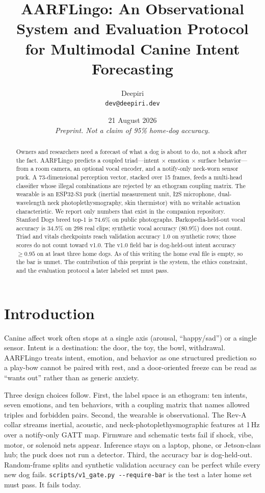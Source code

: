 \documentclass[11pt]{article}
\title{AARFLingo: An Observational System and Evaluation Protocol\\
for Multimodal Canine Intent Forecasting}
\author{Deepiri\\
\texttt{dev@deepiri.dev}}
\date{21 August 2026\\[0.4em]
\textit{Preprint. Not a claim of 95\% home-dog accuracy.}}
\begin{document}
\maketitle

\begin{abstract}
Owners and researchers need a forecast of what a dog is about to do, not a shock after the fact.
AARFLingo predicts a coupled triad---intent $\times$ emotion $\times$ surface behavior---from a room camera,
an optional vocal encoder, and a notify-only neck-worn sensor puck.
A 73-dimensional perception vector, stacked over 15 frames, feeds a multi-head classifier whose illegal
combinations are rejected by an ethogram coupling matrix.
The wearable is an ESP32-S3 puck (inertial measurement unit, I2S microphone, dual-wavelength neck
photoplethysmography, skin thermistor) with no writable actuation characteristic.
We report only numbers that exist in the companion repository.
Stanford Dogs breed top-1 is 74.6\% on public photographs.
Barkopedia-held-out vocal accuracy is 34.5\% on 298 real clips; synthetic vocal accuracy (80.9\%) does not count.
Triad and vitals checkpoints reach validation accuracy 1.0 on synthetic rows; those scores do not count toward v1.0.
The v1.0 field bar is dog-held-out intent accuracy $\ge 0.95$ on at least three home dogs.
As of this writing the home eval file is empty, so the bar is unmet.
The contribution of this preprint is the system, the ethics constraint, and the evaluation protocol a later labeled set must pass.
\end{abstract}

\section{Introduction}

Canine affect work often stops at a single axis (arousal, ``happy/sad'') or a single sensor.
Intent is a destination: the door, the toy, the bowl, withdrawal.
AARFLingo treats intent, emotion, and behavior as one structured prediction so a play-bow cannot be
paired with rest, and a door-oriented freeze can be read as ``wants out'' rather than as generic anxiety.

Three design choices follow.
First, the label space is an ethogram: ten intents, seven emotions, and ten behaviors, with a coupling
matrix that names allowed triples and forbidden pairs.
Second, the wearable is observational.
The Rev-A collar streams inertial, acoustic, and neck-photoplethysmographic features at 1\,Hz over a
notify-only GATT map.
Firmware and schematic tests fail if shock, vibe, motor, or solenoid nets appear.
Inference stays on a laptop, phone, or Jetson-class hub; the puck does not run a detector.
Third, the accuracy bar is dog-held-out.
Random-frame splits and synthetic validation accuracy can be perfect while every new dog fails.
\texttt{scripts/v1\_gate.py -{}-require-bar} is the test a later home set must pass.
It fails today.
\end{document}
